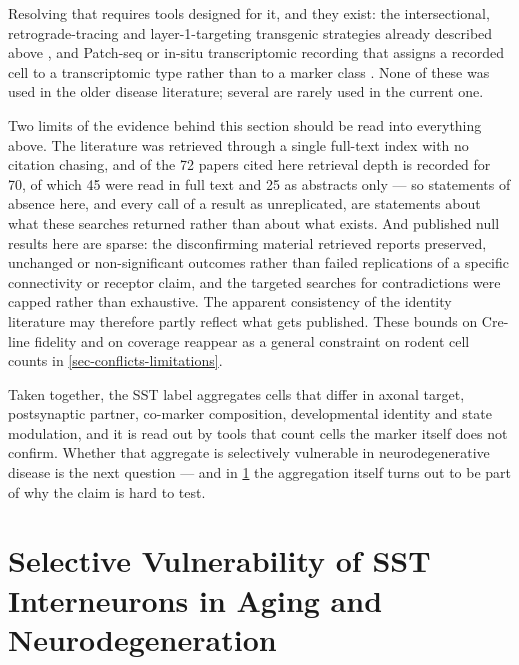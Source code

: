 \documentclass[11pt]{article}
\begin{document}
Resolving that requires tools designed for it, and they exist: the intersectional, retrograde-tracing and layer-1-targeting transgenic strategies already described above \citep{Wu2023,Hostetler2023,Ma2006}, and Patch-seq or in-situ transcriptomic recording that assigns a recorded cell to a transcriptomic type rather than to a marker class \citep{Scala2019,Bugeon2022}. None of these was used in the older disease literature; several are rarely used in the current one.

Two limits of the evidence behind this section should be read into everything above. The literature was retrieved through a single full-text index with no citation chasing, and of the 72 papers cited here retrieval depth is recorded for 70, of which 45 were read in full text and 25 as abstracts only --- so statements of absence here, and every call of a result as unreplicated, are statements about what these searches returned rather than about what exists. And published null results here are sparse: the disconfirming material retrieved reports preserved, unchanged or non-significant outcomes rather than failed replications of a specific connectivity or receptor claim, and the targeted searches for contradictions were capped rather than exhaustive. The apparent consistency of the identity literature may therefore partly reflect what gets published. These bounds on Cre-line fidelity and on coverage reappear as a general constraint on rodent cell counts in \ref{sec-conflicts-limitations}.

Taken together, the SST label aggregates cells that differ in axonal target, postsynaptic partner, co-marker composition, developmental identity and state modulation, and it is read out by tools that count cells the marker itself does not confirm. Whether that aggregate is selectively vulnerable in neurodegenerative disease is the next question --- and in \ref{sec-selective-vulnerability} the aggregation itself turns out to be part of why the claim is hard to test.

\section{Selective Vulnerability of SST Interneurons in Aging and Neurodegeneration}
\label{sec-selective-vulnerability}
\end{document}
